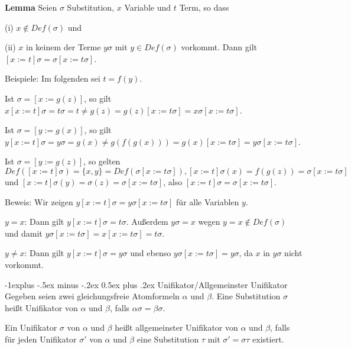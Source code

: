 \documentclass[a4paper]{article}
\makeatletter
\renewcommand{\note}[2]{\begin{noteBox} \textbf{#1} #2 \end{noteBox}}
\renewcommand{\subsection}{\@startsection{subsection}{2}{0mm}%
                {-1explus -.5ex minus -.2ex}%
                {0.5ex plus .2ex}%
                {\normalfont\normalsize\bfseries}}
\makeatother
\begin{document}
\begin{multicols}{3}
  \note{Lemma}{Seien $\sigma$ Substitution, $x$ Variable und $t$ Term, so dass
    \begin{itemize*}
      \item (i) $x\not\in Def(\sigma)$ und
      \item (ii) $x$ in keinem der Terme $y\sigma$ mit $y\in Def(\sigma)$ vorkommt.
      Dann gilt $[x:=t]\sigma=\sigma[x:=t\sigma]$.
    \end{itemize*}
  }

  Beispiele: Im folgenden sei $t=f(y)$.
  \begin{itemize*}
    \item Ist $\sigma=[x:=g(z)]$, so gilt $x[x:=t]\sigma=t\sigma=t\not=g(z) =g(z)[x:=t\sigma] =x\sigma[x:=t\sigma]$.
    \item Ist $\sigma= [y:=g(x)]$, so gilt $y[x:=t]\sigma=y\sigma=g(x) \not=g(f(g(x)))= g(x) [x:=t\sigma] =y\sigma[x:=t\sigma]$.
    \item Ist $\sigma= [y:=g(z)]$, so gelten $Def([x:=t]\sigma) =\{x,y\}=Def(\sigma[x:=t\sigma]),[x:=t]\sigma(x) =f(g(z)) =\sigma[x:=t\sigma]$ und $[x:=t]\sigma(y) =\sigma(z) =\sigma[x:=t\sigma]$, also $[x:=t]\sigma=\sigma[x:=t\sigma]$.
  \end{itemize*}

  Beweis: Wir zeigen $y[x:=t]\sigma=y\sigma[x:=t\sigma]$ für alle Variablen $y$.
  \begin{itemize*}
    \item $y=x$: Dann gilt $y[x:=t]\sigma=t\sigma$. Außerdem $y\sigma=x$ wegen $y=x\not\in Def(\sigma)$ und damit $y\sigma[x:=t\sigma]=x[x:=t\sigma]=t\sigma$.
    \item $y\not =x$: Dann gilt $y[x:=t]\sigma=y\sigma$ und ebenso $y\sigma[x:=t\sigma]=y\sigma$, da $x$ in $y\sigma$ nicht vorkommt.
  \end{itemize*}

  \subsection{Unifikator/Allgemeinster Unifikator}
  Gegeben seien zwei gleichungsfreie Atomformeln $\alpha$ und $\beta$. Eine Substitution $\sigma$ heißt Unifikator von $\alpha$ und $\beta$, falls $\alpha\sigma=\beta\sigma$.

  Ein Unifikator $\sigma$ von $\alpha$ und $\beta$ heißt allgemeinster Unifikator von $\alpha$ und $\beta$, falls für jeden Unifikator $\sigma'$ von $\alpha$ und $\beta$ eine Substitution $\tau$ mit $\sigma'=\sigma \tau$ existiert.


\end{multicols}
\end{document}
